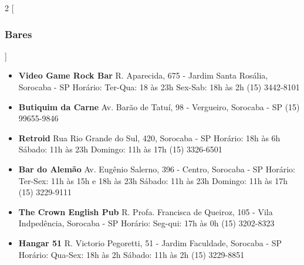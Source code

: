 \begin{multicols}{2}
  [
  \subsubsection{Bares}
  ]
  \begin{itemize}
    \item \textbf{Video Game Rock Bar}
      \newline R. Aparecida, 675 - Jardim Santa Rosália, Sorocaba - SP
      \newline Horário: Ter-Qua: 18 às 23h Sex-Sab: 18h às 2h
      \newline (15) 3442-8101
  \end{itemize}
  \begin{itemize}
    \item \textbf{Butiquim da Carne}
      \newline Av. Barão de Tatuí, 98 - Vergueiro, Sorocaba - SP
      \newline (15) 99655-9846
  \end{itemize}
  \begin{itemize}
    \item \textbf{Retroid}
      \newline Rua Rio Grande do Sul, 420, Sorocaba - SP
      \newline Horário: 18h às 6h
      \newline Sábado: 11h às 23h Domingo: 11h às 17h
      \newline (15) 3326-6501
  \end{itemize}
  \begin{itemize}
    \item \textbf{Bar do Alemão}
      \newline Av. Eugênio Salerno, 396 - Centro, Sorocaba - SP
      \newline Horário: Ter-Sex: 11h às 15h e 18h às 23h
      \newline Sábado: 11h às 23h Domingo: 11h às 17h
      \newline (15) 3229-9111
  \end{itemize}
  \begin{itemize}
    \item \textbf{The Crown English Pub}
      \newline R. Profa. Francisca de Queiroz, 105 - Vila Indpedência, Sorocaba - SP
      \newline Horário: Seg-qui: 17h às 0h
      \newline (15) 3202-8323
  \end{itemize}
  \begin{itemize}
    \item \textbf{Hangar 51}
      \newline R. Victorio Pegoretti, 51 - Jardim Faculdade, Sorocaba - SP
      \newline Horário: Qua-Sex: 18h às 2h
      \newline Sábado: 11h às 2h
      \newline (15) 3229-8851
  \end{itemize}
\end{multicols}
